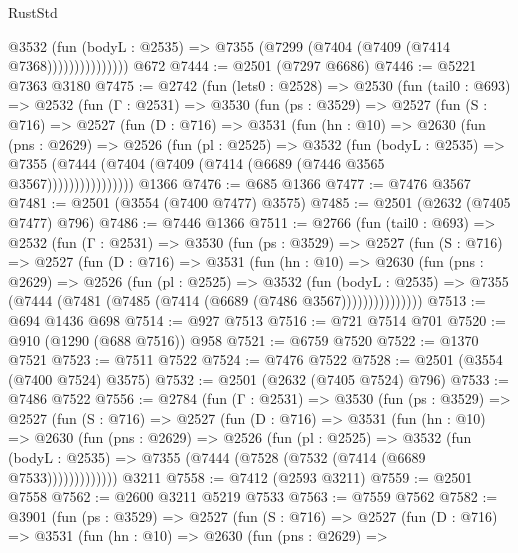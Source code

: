 \begin{lexlean}{RustStd}
\begin{coremodule}
{\begin{coremodule}
{{{{{{{{{{{{{{{{{{{{                      @3532
                        (fun (bodyL : @2535) =>
                        @7355 (@7299 (@7404 (@7409 (@7414 @7368)))))))))))))))
    @672
@7444 := @2501 (@7297 @6686)
@7446 := @5221 @7363 @3180
@7475 := @2742
    (fun (lets0 : @2528) =>
    @2530
      (fun (tail0 : @693) =>
      @2532
        (fun (Γ : @2531) =>
        @3530
          (fun (ps : @3529) =>
          @2527
            (fun (S : @716) =>
            @2527
              (fun (D : @716) =>
              @3531
                (fun (hn : @10) =>
                @2630
                  (fun (pns : @2629) =>
                  @2526
                    (fun (pl : @2525) =>
                    @3532
                      (fun (bodyL : @2535) =>
                      @7355 (@7444 (@7404 (@7409 (@7414 (@6689 (@7446 @3565 @3567))))))))))))))))
    @1366
@7476 := @685 @1366
@7477 := @7476 @3567
@7481 := @2501 (@3554 (@7400 @7477) @3575)
@7485 := @2501 (@2632 (@7405 @7477) @796)
@7486 := @7446 @1366
@7511 := @2766
    (fun (tail0 : @693) =>
    @2532
      (fun (Γ : @2531) =>
      @3530
        (fun (ps : @3529) =>
        @2527
          (fun (S : @716) =>
          @2527
            (fun (D : @716) =>
            @3531
              (fun (hn : @10) =>
              @2630
                (fun (pns : @2629) =>
                @2526
                  (fun (pl : @2525) =>
                  @3532
                    (fun (bodyL : @2535) =>
                    @7355 (@7444 (@7481 (@7485 (@7414 (@6689 (@7486 @3567)))))))))))))))
@7513 := @694 @1436 @698
@7514 := @927 @7513
@7516 := @721 @7514 @701
@7520 := @910 (@1290 (@688 @7516)) @958
@7521 := @6759 @7520
@7522 := @1370 @7521
@7523 := @7511 @7522
@7524 := @7476 @7522
@7528 := @2501 (@3554 (@7400 @7524) @3575)
@7532 := @2501 (@2632 (@7405 @7524) @796)
@7533 := @7486 @7522
@7556 := @2784
    (fun (Γ : @2531) =>
    @3530
      (fun (ps : @3529) =>
      @2527
        (fun (S : @716) =>
        @2527
          (fun (D : @716) =>
          @3531
            (fun (hn : @10) =>
            @2630
              (fun (pns : @2629) =>
              @2526
                (fun (pl : @2525) =>
                @3532
                  (fun (bodyL : @2535) =>
                  @7355 (@7444 (@7528 (@7532 (@7414 (@6689 @7533)))))))))))))
    @3211
@7558 := @7412 (@2593 @3211)
@7559 := @2501 @7558
@7562 := @2600 @3211 @5219 @7533
@7563 := @7559 @7562
@7582 := @3901
    (fun (ps : @3529) =>
    @2527
      (fun (S : @716) =>
      @2527
        (fun (D : @716) =>
        @3531
          (fun (hn : @10) =>
          @2630
            (fun (pns : @2629) =>
}}}}}}}}}}}}}}}}}}}}
\end{coremodule}}
\end{coremodule}
\end{lexlean}
